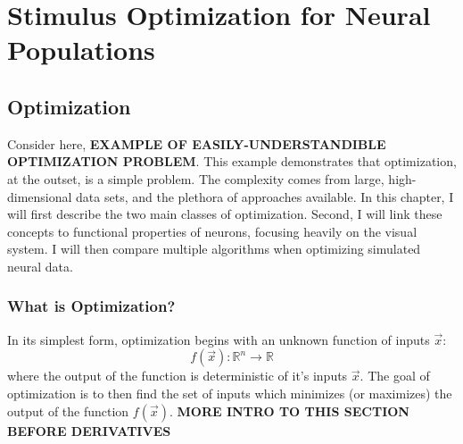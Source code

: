 
\chapter{Stimulus Optimization for Neural Populations} %

\label{ch:optim} %


\newcommand{\keyword}[1]{\textbf{#1}}



\section{Optimization}
Consider here, \textbf{EXAMPLE OF EASILY-UNDERSTANDIBLE OPTIMIZATION PROBLEM}. This example demonstrates that optimization, at the outset, is a simple problem. The complexity comes from large, high-dimensional data sets, and the plethora of approaches available. In this chapter, I will first describe the two main classes of optimization. Second, I will link these concepts to functional properties of neurons, focusing heavily on the visual system. I will then compare multiple algorithms when optimizing simulated neural data. 
\subsection*{What is Optimization?}
In its simplest form, optimization begins with an unknown function of inputs $\vec{x}$:
\begin{equation}
	f(\vec{x}) : \mathbb{R}^{n} \rightarrow \mathbb{R}
\end{equation}
where the output of the function is deterministic of it's inputs $\vec{x}$. The goal of optimization is to then find the set of inputs which minimizes (or maximizes) the output of the function $f(\vec{x})$. \textbf{MORE INTRO TO THIS SECTION BEFORE DERIVATIVES}

